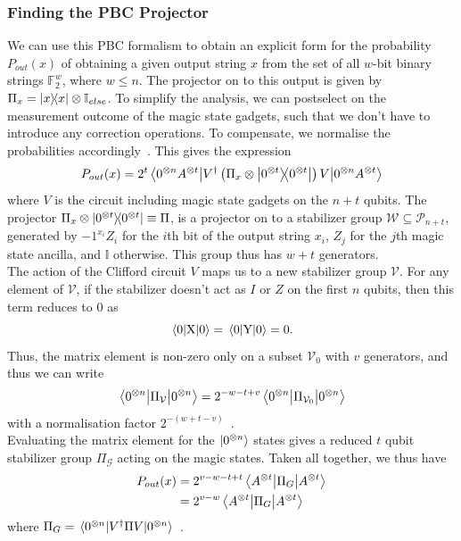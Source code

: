 \documentclass{standalone}
\begin{document}
\subsubsection*{Finding the PBC Projector}\label{sec:pbcproj}
We can use this PBC formalism to obtain an explicit form for the probability $P_{out}(x)$ of obtaining a given output string $x$ from the set of all $w$-bit binary strings $\mathbb{F}_{2}^{w}$, where $w\leq n$. The projector on to this output is given by $\Pi_{x} = \ketbra{x}{x}\otimes\mathbb{I}_{else}$. To simplify the analysis, we can postselect on the measurement outcome of the magic state gadgets, such that we don't have to introduce any correction operations. To compensate, we normalise the probabilities accordingly~\cite{Bravyi2015}. This gives the expression
\begin{equation}
P_{out}(x) = 2^{t}\matrixel{0^{\otimes n}A^{\otimes t}}{V^{\dagger}\left(\Pi_{x}\otimes\ketbra{0^{\otimes t}}{0^{\otimes t}}\right)V}{0^{\otimes n}A^{\otimes t}}
\end{equation}
where $V$ is the circuit including magic state gadgets on the $n+t$ qubits. The projector $\Pi_{x}\otimes\ketbra{0^{\otimes t}}{0^{\otimes t}}\equiv\Pi$, is a projector on to a stabilizer group $\mathcal{W}\subseteq\mathcal{P}_{n+t}$, generated by $-1^{x_{i}}Z_{i}$ for the $i$th bit of the output string $x_{i}$, $Z_{j}$ for the $j$th magic state ancilla, and $\mathbb{I}$ otherwise. This group thus has $w+t$ generators.\\
The action of the Clifford circuit $V$ maps us to a new stabilizer group $\mathcal{V}$. For any element of $\mathcal{V}$, if the stabilizer doesn't act as $I$ or $Z$ on the first $n$ qubits, then this term reduces to $0$ as 
\[\matrixel{0}{\text{X}}{0}=\matrixel{0}{\text{Y}}{0}=0.\]
Thus, the matrix element is non-zero only on a subset $\mathcal{V}_{0}$ with $v$ generators, and thus we can write
\begin{equation}
    \matrixel{0^{\otimes n}}{\Pi_{\mathcal{V}}}{0^{\otimes n}} = 2^{-w-t+v}\matrixel{0^{\otimes n}}{\Pi_{\mathcal{V}_{0}}}{0^{\otimes n}}
\end{equation}
with a normalisation factor $2^{-\left(w+t-v\right)}$~\cite{Bravyi2016b}.\\
Evaluating the matrix element for the $\ket{0^{\otimes n}}$ states gives a reduced $t$ qubit stabilizer group $\Pi_{\mathcal{G}}$ acting on the magic states. Taken all together, we thus have 
\begin{align}
\begin{split}
    P_{out}(x) &= 2^{v-w-t+t}\matrixel{A^{\otimes t}}{\Pi_{G}}{A^{\otimes t}}\\
    &= 2^{v-w}\matrixel{A^{\otimes t}}{\Pi_{G}}{A^{\otimes t}}
\end{split}
\end{align}
where $\Pi_{G}=\matrixel{0^{\otimes n}}{V^{\dagger}\Pi V}{0^{\otimes n}}$~\cite{Bravyi2016b}. 
\end{document}
